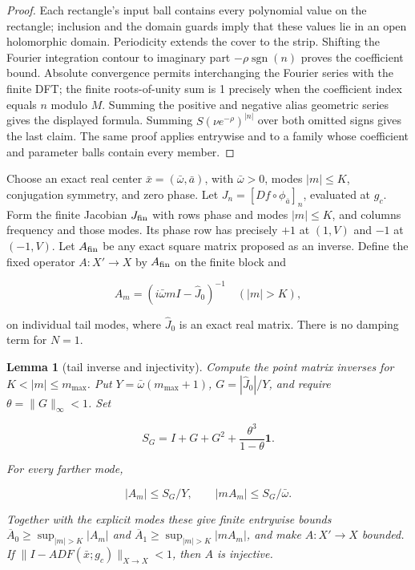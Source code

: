 \documentclass[11pt]{article}
\newtheorem{lemma}{Lemma}[section]
\theoremstyle{definition}
\begin{document}
\begin{proof} Each rectangle's input ball contains every polynomial value on the rectangle; inclusion and the domain guards imply that these values lie in an open holomorphic domain. Periodicity extends the cover to the strip. Shifting the Fourier integration contour to imaginary part $-\rho\operatorname{sgn}(n)$ proves the coefficient bound. Absolute convergence permits interchanging the Fourier series with the finite DFT; the finite roots-of-unity sum is 1 precisely when the coefficient index equals $n$ modulo $M$. Summing the positive and negative alias geometric series gives the displayed formula. Summing $S(\nu e^{-\rho})^{|n|}$ over both omitted signs gives the last claim. The same proof applies entrywise and to a family whose coefficient and parameter balls contain every member. \end{proof}

Choose an exact real center $\bar x=(\bar\omega,\bar a)$, with $\bar\omega>0$, modes $|m|\le K$, conjugation symmetry, and zero phase. Let $J_n=[Df\circ\phi_{\bar a}]_n$, evaluated at $g_c$. Form the finite Jacobian $J_{\rm fin}$ with rows phase and modes $|m|\le K$, and columns frequency and those modes. Its phase row has precisely $+1$ at $(1,V)$ and $-1$ at $(-1,V)$. Let $A_{\rm fin}$ be any exact square matrix proposed as an inverse. Define the fixed operator $A:X'\to X$ by $A_{\rm fin}$ on the finite block and

\[
 A_m=(i\bar\omega mI-\widehat J_0)^{-1}\quad(|m|>K),
\]

on individual tail modes, where $\widehat J_0$ is an exact real matrix. There is no damping term for $N=1$.

\begin{lemma}[tail inverse and injectivity]\label{lem:cg-2-2} Compute the point matrix inverses for $K<|m|\le m_{\max}$. Put $Y=\bar\omega(m_{\max}+1)$, $G=|\widehat J_0|/Y$, and require $\theta=\|G\|_\infty<1$. Set

\[
 S_G=I+G+G^2+\frac{\theta^3}{1-\theta}\mathbf1.
\]

For every farther mode,

\[
 |A_m|\le S_G/Y,\qquad |mA_m|\le S_G/\bar\omega.
\]

Together with the explicit modes these give finite entrywise bounds $\overline A_0\ge\sup_{|m|>K}|A_m|$ and $\overline A_1\ge\sup_{|m|>K}|mA_m|$, and make $A:X'\to X$ bounded. If $\|I-A DF(\bar x;g_c)\|_{X\to X}<1$, then $A$ is injective.

\end{lemma}
\end{document}
